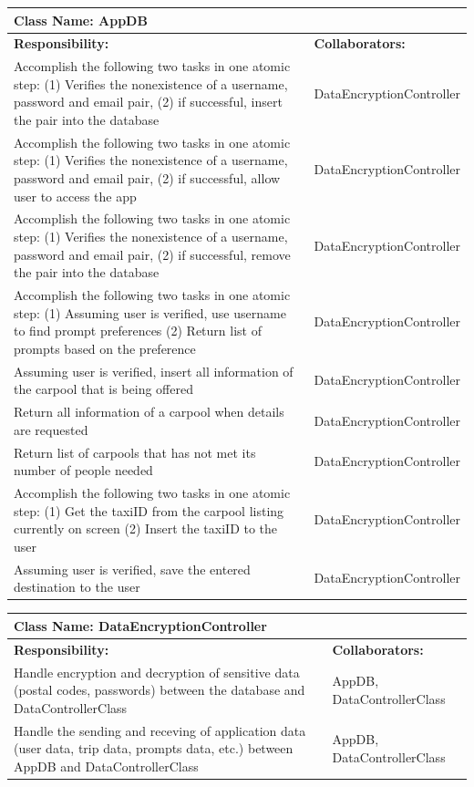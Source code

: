 \documentclass[]{article}
\begin{document}
	\begin{table}[H]
	\centering
	\begin{tabular}{|p{6cm}|p{6cm}|}
	\hline 
		\multicolumn{2}{|l|}{\textbf{Class Name: AppDB}} \\
	\hline
	\textbf{Responsibility:} & \textbf{Collaborators:} \\
	\hline
	Accomplish the following two tasks in one atomic step: (1) Verifies the nonexistence of a username, password and email pair, (2) if successful, insert the pair into the database & DataEncryptionController \\ \hline
	Accomplish the following two tasks in one atomic step: (1) Verifies the nonexistence of a username, password and email pair, (2) if successful, allow user to access the app & DataEncryptionController\\ \hline
	Accomplish the following two tasks in one atomic step: (1) Verifies the nonexistence of a username, password and email pair, (2) if successful, remove the pair into the database & DataEncryptionController\\ \hline
	Accomplish the following two tasks in one atomic step: (1) Assuming user is verified, use username to find prompt preferences (2) Return list of prompts based on the preference & DataEncryptionController\\ \hline
	Assuming user is verified, insert all information of the carpool that is being offered & DataEncryptionController\\ \hline
	Return all information of a carpool when details are requested & DataEncryptionController\\ \hline
	Return list of carpools that has not met its number of people needed & DataEncryptionController\\ \hline
	Accomplish the following two tasks in one atomic step: (1) Get the taxiID from the carpool listing currently on screen (2) Insert the taxiID to the user & DataEncryptionController\\ \hline
	Assuming user is verified, save the entered destination to the user & DataEncryptionController\\ \hline
	\end{tabular}
	\end{table}%

	\begin{table}[H]
	\centering
	\begin{tabular}{|p{6cm}|p{6cm}|}
	\hline 
		\multicolumn{2}{|l|}{\textbf{Class Name: DataEncryptionController}} \\
	\hline
	\textbf{Responsibility:} & \textbf{Collaborators:} \\
	\hline
	Handle encryption and decryption of sensitive data (postal codes, passwords) between the database and DataControllerClass& AppDB, DataControllerClass\\ \hline
	Handle the sending and receving of application data (user data, trip data, prompts data, etc.) between AppDB and DataControllerClass & AppDB, DataControllerClass\\ \hline
	\end{tabular}
	\end{table}
\end{document}
